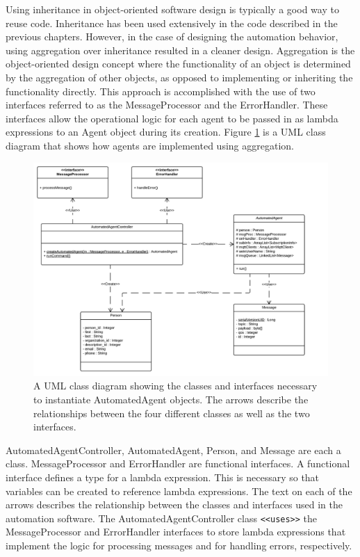 Using inheritance in object-oriented software design is typically a good way to reuse code. Inheritance has been used extensively in the code described in the previous chapters. However, in the case of designing the automation behavior, using aggregation over inheritance resulted in a cleaner design. Aggregation is the object-oriented design concept where the functionality of an object is determined by the aggregation of other objects, as opposed to implementing or inheriting the functionality directly. This approach is accomplished with the use of two interfaces referred to as the MessageProcessor and the ErrorHandler. These interfaces allow the operational logic for each agent to be passed in as lambda expressions to an Agent object during its creation. Figure \ref{fig:automation_class_diagram} is a UML class diagram that shows how agents are implemented using aggregation.

\begin{figure}[H]
	\centering
	\includegraphics[width=\textwidth]{figures/automated_agent_class_diagram.png}
	\caption{A UML class diagram showing the classes and interfaces necessary to instantiate AutomatedAgent objects. The arrows describe the relationships between the four different classes as well as the two interfaces. }
	\label{fig:automation_class_diagram}
\end{figure}

AutomatedAgentController, AutomatedAgent, Person, and Message are each a class. MessageProcessor and ErrorHandler are functional interfaces. A functional interface defines a type for a lambda expression. This is necessary so that variables can be created to reference lambda expressions.  The text on each of the arrows describes the relationship between the classes and interfaces used in the automation software. The AutomatedAgentController class \verb|<<uses>>| the MessageProcessor and ErrorHandler interfaces to store lambda expressions that implement the logic for processing messages and for handling errors, respectively.


